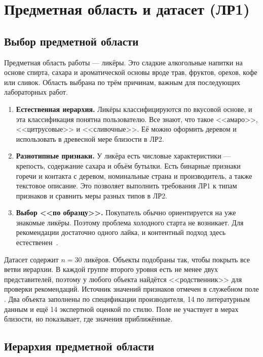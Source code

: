 \chapter{Предметная область и датасет (ЛР1)}

\section{Выбор предметной области}

Предметная область работы --- ликёры. Это сладкие алкогольные напитки на основе спирта, сахара и ароматической основы вроде трав, фруктов, орехов, кофе или сливок. Область выбрана по трём причинам, важным для последующих лабораторных работ.
\begin{enumerate}[leftmargin=1.6\parindent]
	\item \textbf{Естественная иерархия.} Ликёры классифицируются по вкусовой основе, и эта классификация понятна пользователю. Все знают, что такое <<амаро>>, <<цитрусовые>> и <<сливочные>>. Её можно оформить деревом и использовать в древесной мере близости в ЛР2.
	\item \textbf{Разнотипные признаки.} У ликёра есть числовые характеристики --- крепость, содержание сахара и объём бутылки. Есть бинарные признаки горечи и контакта с деревом, номинальные страна и производитель, а также текстовое описание. Это позволяет выполнить требования ЛР1 к типам признаков и сравнить меры разных типов в ЛР2.
	\item \textbf{Выбор <<по образцу>>.} Покупатель обычно ориентируется на уже знакомые ликёры. Поэтому проблема холодного старта не возникает. Для рекомендации достаточно одного лайка, и контентный подход здесь естественен~\cite{lops2011, pazzani2007}.
\end{enumerate}

Датасет содержит $n = 30$ ликёров. Объекты подобраны так, чтобы покрыть все ветви иерархии. В каждой группе второго уровня есть не менее двух представителей, поэтому у любого объекта найдётся <<родственник>> для проверки рекомендаций. Источник значений признаков отмечен в служебном поле . Два объекта заполнены по спецификации производителя, 14 по литературным данным и ещё 14 экспертной оценкой по стилю. Поле не участвует в мерах близости, но показывает, где значения приближённые.

\section{Иерархия предметной области}


